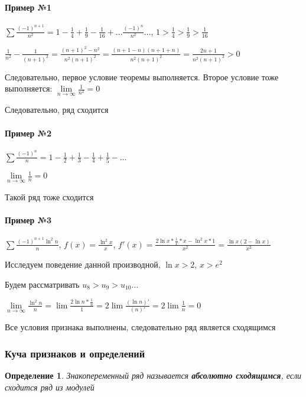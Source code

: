 \documentclass{article}
\newtheorem{definition}{Определение}
\begin{document}
\paragraph{Пример №1} $\sum \frac{(-1)^{n + 1}}{n^2} = 1 - \frac{1}{4} + \frac{1}{9} - \frac{1}{16} + \dots \frac{(-1)^{n}}{n^2} \dots$, $1 > \frac{1}{4} > \frac{1}{9} > \frac{1}{16}$

$\frac{1}{n^2} - \frac{1}{(n + 1)^2} = \frac{(n + 1)^2 - n^2}{n^2 (n + 1)^2} = \frac{(n + 1 - n) (n + 1 + n)}{n^2 (n + 1)^2} = \frac{2 n + 1}{n^2 (n + 1)^2} > 0$

Следовательно, первое условие теоремы выполняется. Второе условие тоже выполняется: $\lim\limits_{n \to \infty} \frac{1}{n^2} = 0$

Следовательно, ряд сходится

\paragraph{Пример №2} $\sum \frac{(-1)^{n}}{n} = 1 - \frac{1}{2} + \frac{1}{3} - \frac{1}{4} + \frac{1}{5} - \dots$

$\lim\limits_{n \to \infty} \frac{1}{n} = 0$

Такой ряд тоже сходится

\paragraph{Пример №3} $\sum \frac{(-1)^{n + 1} \ln^{2} n}{n}$, $f(x) = \frac{\ln^2 x}{x}$, $f'(x) = \frac{2 \ln x * \frac{1}{x} * x - \ln^{2} x * 1}{x^2} = \frac{\ln x (2 - \ln x)}{x^{2}}$

Исследуем поведение данной производной, $\ln x > 2$, $x > e^{2}$

Будем рассматривать $u_8 > u_9 > u_{10} \dots$

$\lim\limits_{n \to \infty} \frac{\ln^{2} n}{n} = \lim \frac{2 \ln n * \frac{1}{n}}{1} = 2 \lim \frac{(\ln n)'}{(n)'} = 2 \lim \frac{1}{n} = 0$

Все условия признака выполнены, следовательно ряд является сходящимся

\subsubsection{Куча признаков и определений}

\begin{definition}

Знакопеременный ряд называется \textbf{абсолютно сходящимся}, если сходится ряд из модулей

\end{definition}
\end{document}

